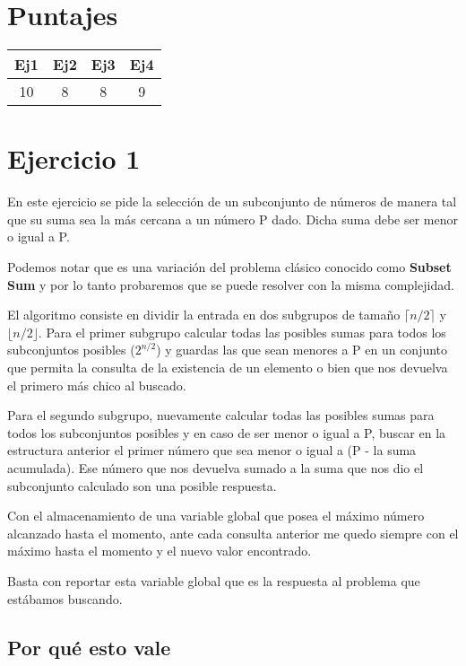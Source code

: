 \section{Puntajes}

\begin{center}
  \begin{tabular}{ | c | c | c | c| }
    \hline
    Ej1& Ej2 & Ej3 & Ej4 \\ \hline
    10 & 8 & 8 & 9 \\ \hline
  \end{tabular}
\end{center}
\newpage


\section{Ejercicio 1}

En este ejercicio se pide la selección de un subconjunto de números de manera tal que su suma sea la más cercana a un número P dado.
Dicha suma debe ser menor o igual a P.

Podemos notar que es una variación del problema clásico conocido como \textbf{Subset Sum} y por lo tanto probaremos que se puede resolver con la misma complejidad.

El algoritmo consiste en dividir la entrada en dos subgrupos de tamaño $\lceil n/2 \rceil$ y $\lfloor n/2 \rfloor$.
Para el primer subgrupo calcular todas las posibles sumas para todos los subconjuntos posibles ($2^{n/2}$) y guardas las que sean menores a P en un conjunto que permita la consulta de la existencia de un elemento o bien que nos devuelva el primero más chico al buscado.

Para el segundo subgrupo, nuevamente calcular todas las posibles sumas para todos los subconjuntos posibles y en caso de ser menor o igual a P, buscar en la estructura anterior el primer número que sea menor o igual a (P - la suma acumulada). Ese número que nos devuelva sumado a la suma que nos dio el subconjunto calculado son una posible respuesta. 

Con el almacenamiento de una variable global que posea el máximo número alcanzado hasta el momento, ante cada consulta anterior me quedo siempre con el máximo hasta el momento y el nuevo valor encontrado. 

Basta con reportar esta variable global que es la respuesta al problema que estábamos buscando.

\subsection{Por qué esto vale}

